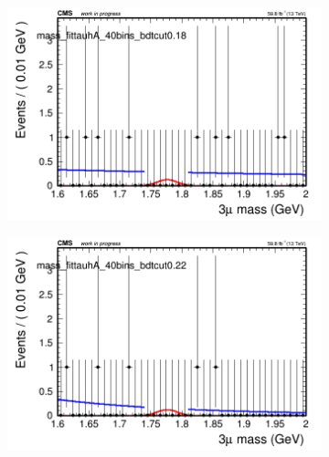 \begin{figure}[H]
\begin{subfigure}{0.2\textwidth}
        \caption{}
    \end{subfigure}
    \begin{subfigure}{0.2\textwidth}
        \includegraphics[width=\textwidth]{power_law/plots/tauhA/massfit_tauhA_40bins_bdtcut0.18.png}
        \caption{}
    \end{subfigure}
    \begin{subfigure}{0.2\textwidth}
        \includegraphics[width=\textwidth]{power_law/plots/tauhA/massfit_tauhA_40bins_bdtcut0.22.png}
        \caption{}
    \end{subfigure}
    \begin{subfigure}{0.2\textwidth}

\end{subfigure}
\end{figure}
